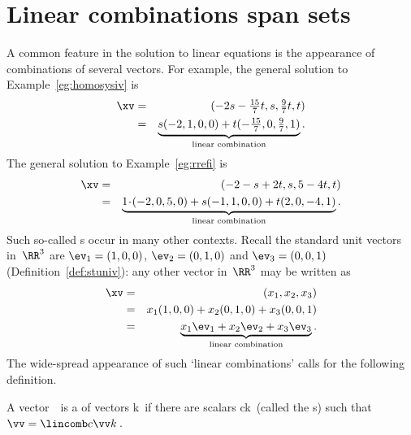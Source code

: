 
\section{Linear combinations span sets}
\label{sec:lcss}
\secttoc

\begin{comment}
\pooliv{\S2.3} \layiv{\S1.3} \holti{\S2.1--2} \nakos{\S2.3}
\end{comment}



A common feature in the solution to linear equations is the  appearance of combinations of several vectors.
For example, the general solution to Example~\ref{eg:homosysiv}  is 
\begin{eqnarray*}
\xv&=&(-2s-\tfrac{15}7t,s,\tfrac97t,t) 
\\&=&\underbrace{s(-2,1,0,0)+t(-\tfrac{15}7,0,\tfrac97,1)}_{\text{linear combination}}.
\end{eqnarray*}
The general solution to Example~\ref{eg:rrefi} is
\begin{eqnarray*}
\xv&=&(-2-s+2t,s,5-4t,t)
\\&=&\underbrace{1\cdot(-2,0,5,0)+s(-1,1,0,0)+t(2,0,-4,1)}_{\text{linear combination}}.
\end{eqnarray*}
Such so-called s occur in many other contexts.
Recall the standard unit vectors in~\(\RR^3\) are \(\ev_1=(1,0,0)\), \(\ev_2=(0,1,0)\) and \(\ev_3=(0,0,1)\) (Definition~\ref{def:stuniv}): any other vector in~\(\RR^3\) may be written as
\begin{eqnarray*}
\xv&=&(x_1,x_2,x_3)
\\&=&x_1(1,0,0)+x_2(0,1,0)+x_3(0,0,1)
\\&=&\underbrace{x_1\ev_1+x_2\ev_2+x_3\ev_3}_{\text{linear combination}}.
\end{eqnarray*}
The wide-spread appearance of such `linear combinations' calls for the following definition.

\begin{definition} \label{def:lincom}
A vector~\vv\ is a  of vectors \hlist\vv k\ if there are scalars \hlist ck\ (called the s) such that \(\vv=\lincomb c\vv k\)\,.
\end{definition}


